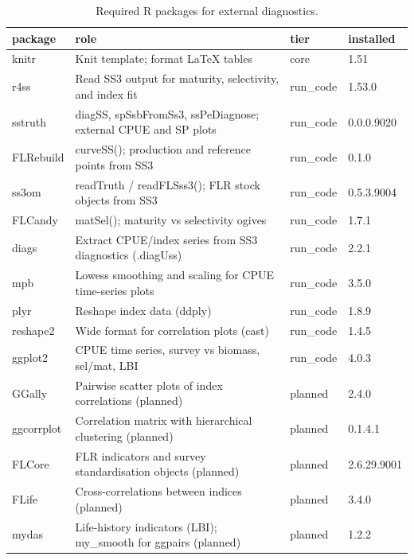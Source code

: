 \begin{table}

\caption{\label{tab:external-libraries}Required R packages for external diagnostics.}
\centering
\begin{tabular}[t]{llll}
\toprule
package & role & tier & installed\\
\midrule
knitr & Knit template; format LaTeX tables & core & 1.51\\
r4ss & Read SS3 output for maturity, selectivity, and index fit & run\_code & 1.53.0\\
sstruth & diagSS, spSsbFromSs3, ssPeDiagnose; external CPUE and SP plots & run\_code & 0.0.0.9020\\
FLRebuild & curveSS(); production and reference points from SS3 & run\_code & 0.1.0\\
ss3om & readTruth / readFLSss3(); FLR stock objects from SS3 & run\_code & 0.5.3.9004\\
\addlinespace
FLCandy & matSel(); maturity vs selectivity ogives & run\_code & 1.7.1\\
diags & Extract CPUE/index series from SS3 diagnostics (.diagUss) & run\_code & 2.2.1\\
mpb & Lowess smoothing and scaling for CPUE time-series plots & run\_code & 3.5.0\\
plyr & Reshape index data (ddply) & run\_code & 1.8.9\\
reshape2 & Wide format for correlation plots (cast) & run\_code & 1.4.5\\
\addlinespace
ggplot2 & CPUE time series, survey vs biomass, sel/mat, LBI & run\_code & 4.0.3\\
GGally & Pairwise scatter plots of index correlations (planned) & planned & 2.4.0\\
ggcorrplot & Correlation matrix with hierarchical clustering (planned) & planned & 0.1.4.1\\
FLCore & FLR indicators and survey standardisation objects (planned) & planned & 2.6.29.9001\\
FLife & Cross-correlations between indices (planned) & planned & 3.4.0\\
\addlinespace
mydas & Life-history indicators (LBI); my\_smooth for ggpairs (planned) & planned & 1.2.2\\
\bottomrule
\end{tabular}
\end{table}

